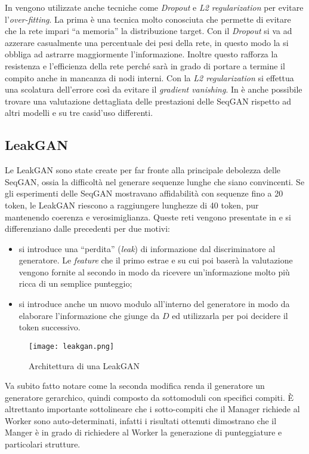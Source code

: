 In \cite{SeqGAN} vengono utilizzate anche tecniche come \emph{Dropout} e \emph{L2 regularization} per evitare l'\emph{over-fitting}. 
La prima è una tecnica molto conosciuta che permette di evitare che la rete impari ``a memoria'' la distribuzione target.
Con il \emph{Dropout} si va ad azzerare casualmente una percentuale dei pesi della rete, in questo modo la si obbliga ad astrarre maggiormente l'informazione.
Inoltre questo rafforza la resistenza e l'efficienza della rete perché sarà in grado di portare a termine il compito anche in mancanza di nodi interni.
Con la \emph{L2 regularization} si effettua una scolatura dell'errore così da evitare il \emph{gradient vanishing}. 
In \cite{SeqGAN} è anche possibile trovare una valutazione dettagliata delle prestazioni delle SeqGAN rispetto ad altri modelli e su tre casi$ $d'uso differenti.


\subsection{LeakGAN}
Le LeakGAN sono state create per far fronte alla principale debolezza delle SeqGAN, ossia la difficoltà nel generare sequenze lunghe che siano convincenti.
Se gli esperimenti delle SeqGAN mostravano affidabilità con sequenze fino a 20 token, le LeakGAN riescono a raggiungere lunghezze di 40 token, pur mantenendo coerenza e verosimiglianza.
Queste reti vengono presentate in \cite{LeakGAN} e si differenziano dalle precedenti per due motivi:
\begin{itemize}
  \item si introduce una ``perdita'' (\emph{leak}) di informazione dal discriminatore al generatore.
    Le \emph{feature} che il primo estrae e su cui poi baserà la valutazione vengono fornite al secondo in modo da ricevere un'informazione molto più ricca di un semplice punteggio; 
  \item si introduce anche un nuovo modulo all'interno del generatore in modo da elaborare l'informazione che giunge da $D$ ed utilizzarla per poi decidere il token successivo.
\end{itemize}
\begin{figure}[ht]
  \centering
  \texttt{[image: leakgan.png]}
  \caption{Architettura di una LeakGAN \cite{LeakGAN}}
  \label{fig:leakgan}
\end{figure}
Va subito fatto notare come la seconda modifica renda il generatore un generatore gerarchico, quindi composto da sottomoduli con specifici compiti.
È altrettanto importante sottolineare che i sotto-compiti che il Manager richiede al Worker sono auto-determinati, infatti i risultati ottenuti dimostrano che il Manger è in grado di richiedere al Worker la generazione di punteggiature e particolari strutture.

